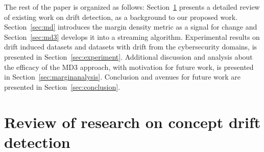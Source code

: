 \documentclass[authoryear,3p,times,twocolumn]{elsarticle}
\begin{document}
The rest of the paper is organized as follows: Section~\ref{sec:review} presents a detailed review of existing work on drift detection, as a background to our proposed work. Section~\ref{sec:md} introduces the margin density metric as a signal for change and Section~\ref{sec:md3} develops it into a streaming algorithm. Experimental results on drift induced datasets and datasets with drift from the cybersecurity domains, is presented in Section~\ref{sec:experiment}. Additional discussion and analysis about the efficacy of the MD3 approach, with motivation for future work, is presented in Section~\ref{sec:marginanalysis}.  Conclusion and avenues for future work are presented in Section~\ref{sec:conclusion}.


\section{Review of research on concept drift detection}
\label{sec:review}
\end{document}
